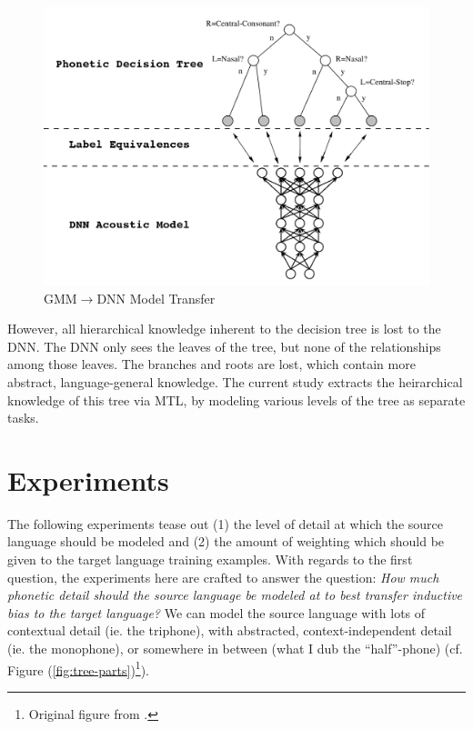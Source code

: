\documentclass[a4paper]{article}
\begin{document}
\begin{figure}[!htbp]
  \centering
{}
  \includegraphics[width=\linewidth]{figs-1/tree-net.png}
  \caption{GMM$\rightarrow$DNN Model Transfer}
    \label{fig:tree-net}
  \endminipage\hfill
\end{figure}

However, all hierarchical knowledge inherent to the decision tree is lost to the DNN. The DNN only sees the leaves of the tree, but none of the relationships among those leaves. The branches and roots are lost, which contain more abstract, language-general knowledge. The current study extracts the heirarchical knowledge of this tree via MTL, by modeling various levels of the tree as separate tasks. 


\section{Experiments}

The following experiments tease out (1) the level of detail at which the source language should be modeled and (2) the amount of weighting which should be given to the target language training examples. With regards to the first question, the experiments here are crafted to answer the question: \textit{How much phonetic detail should the source language be modeled at to best transfer inductive bias to the target language?} We can model the source language with lots of contextual detail (ie. the triphone), with abstracted, context-independent detail (ie. the monophone), or somewhere in between (what I dub the ``half''-phone) (cf. Figure (\ref{fig:tree-parts})\footnote{Original figure from \cite{young2002}.}).
\end{document}
